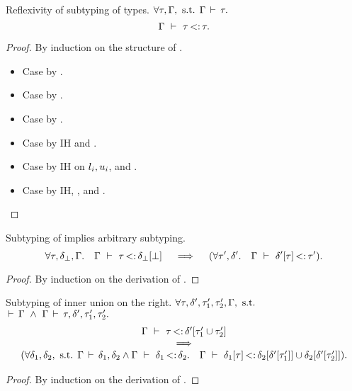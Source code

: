 \begin{theorem}{Reflexivity of subtyping of types.}\label{thm:sub-ty-refl}
    $\forall \tau, \Gamma, \text{ s.t. } \Gamma\,\vdash\,\tau.$
    \[\Gamma\ \vdash\ \tau \operatorname{<:} \tau.\]
\end{theorem}
\begin{proof}
    By induction on the structure of \ty.
    \begin{itemize}
        \item Case \tyany by .
        \item Case \tybot by .
        \item Case \vany by .
        \item Case  by IH and .
        \item Case \tyinv{} by IH on
            $l_i, u_i$, and .
        \item Case  by IH, ,
            and .
    \end{itemize}
\end{proof}

\begin{lemma}{Subtyping of \tybot implies arbitrary subtyping.}\label{lem:sub-of-bot}
    \[
    \forall \tau, \delta_{\bot}, \Gamma.\quad 
    \Gamma\ \vdash\ \tau \operatorname{<:} \delta_{\bot}[\bot]
    \quad\implies\quad
    (\forall \tau', \delta'.\quad \Gamma\ \vdash\ \delta'[\tau] \operatorname{<:} \tau').
    \]
\end{lemma}
\begin{proof}
    By induction on the derivation of 
    \subtydflt{\ty}{\plug{\dctx_{\tybot}}\tybot}.
\end{proof}

\begin{lemma}{Subtyping of inner union on the right.}%
\label{lem:sub-inner-union-right}
    $\forall \tau, \delta', \tau'_1, \tau'_2, \Gamma, \text{ s.t. }$\\
    $\,\vdash\,\Gamma\ \land\ \Gamma\,\vdash\,\tau, \delta', \tau'_1, \tau'_2.$
    \[
        \begin{array}{ccc}
        \Gamma\ \vdash\ \tau \operatorname{<:} \delta'[\tau'_1 \cup \tau'_2]\\
        \quad\implies\quad\\
        (\forall \delta_1, \delta_2, \text{ s.t. }
        \Gamma\,\vdash\,\delta_1, \delta_2 \land
        \Gamma\ \vdash\ \delta_1 \operatorname{<:} \delta_2.\quad
        \Gamma\ \vdash\ \delta_1[\tau] \operatorname{<:} \delta_2[\delta'[\tau'_1]] \cup \delta_2[\delta'[\tau'_2]]
            ).
        \end{array}
    \]
\end{lemma}
\begin{proof}
    By induction on the derivation of
    .
\end{proof}

